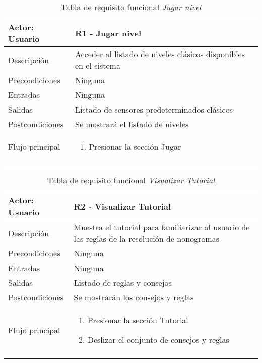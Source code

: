 \medspace

\newcommand\addrow[2]{#1 &#2\\ }

\newcommand\addheading[2]{#1 &#2\\ \hline}
\newcommand\tabularhead{\begin{tabular}{lp{9cm}}
\hline
}

\newcommand\addmulrow[2]{ \begin{minipage}[t][][t]{4cm}#1\end{minipage}%
   &\begin{minipage}[t][][t]{8.5cm}
    \begin{enumerate} #2   \end{enumerate}
    \end{minipage}\\ }
    

\newenvironment{usecase}{\tabularhead}
{\hline\end{tabular}}

\begin{table}[H]
\begin{usecase}
  \addheading{Actor: \textbf{Usuario}}{\textbf{R1 - Jugar nivel}}
  \addrow{Descripción}{Acceder al listado de niveles clásicos disponibles en el sistema}
  \addrow{Precondiciones}{Ninguna}
  \addrow{Entradas}{Ninguna}
  \addrow{Salidas}{Listado de sensores predeterminados clásicos}
  \addrow{Postcondiciones}{Se mostrará el listado de niveles}
  \addmulrow{Flujo principal}{\item Presionar la sección Jugar
                                   }
                                  \addrow{}{}
\end{usecase}
\caption{Tabla de requisito funcional \textit{Jugar nivel}}
\label{table:req1}
\end{table}

\begin{table}[H]
  \begin{usecase}
    \addheading{Actor: \textbf{Usuario}}{\textbf{R2 - Visualizar Tutorial}}
    \addrow{Descripción}{Muestra el tutorial para familiarizar al usuario de las reglas de
    la resolución de nonogramas}
    \addrow{Precondiciones}{Ninguna}
    \addrow{Entradas}{Ninguna}
    \addrow{Salidas}{Listado de reglas y consejos}
    \addrow{Postcondiciones}{Se mostrarán los consejos y reglas }
    \addmulrow{Flujo principal}{\item Presionar la sección Tutorial
    \item Deslizar el conjunto de consejos y reglas
                                     }
                                    \addrow{}{}
  \end{usecase}
  \caption{Tabla de requisito funcional \textit{Visualizar Tutorial}}
  \label{table:req2}
  \end{table}

